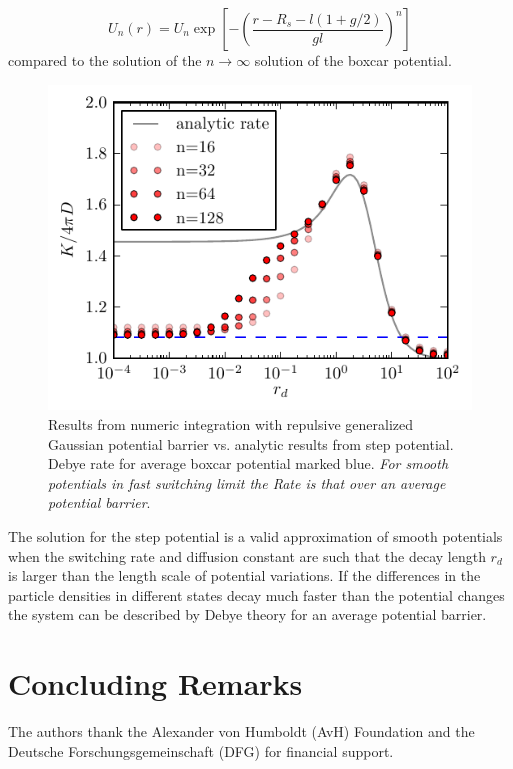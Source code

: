 \documentclass[twocolumn,superscriptaddress]{revtex4}
\begin{document}
\begin{equation}
    U_n(r) = U_n \exp \left[- \left(\frac{r-R_s-l(1+g/2)}{gl}\right)^{n} \right] 
    \label{generalized_gaussian}
\end{equation}
compared to the solution of the $n \rightarrow \infty$ solution of the boxcar potential.
\begin{figure}[H]
    \includegraphics[width= 0.5 \textwidth]{plots/rates_for_barrier_transition.pdf}
    \caption{Results from numeric integration with repulsive generalized Gaussian potential barrier vs. analytic results from step potential. Debye rate for average boxcar potential marked blue. \emph{For smooth potentials in fast switching limit the Rate is that over an average potential barrier}.}
\end{figure}
The solution for the step potential is a valid approximation of smooth potentials when the switching rate and diffusion constant are such that the decay length $r_d$ is larger than the length scale of potential variations. If the differences in the particle densities in different states decay much faster than the potential changes the system can be described by Debye theory for an average potential barrier. 

\section{Concluding Remarks}

\acknowledgments
The authors thank the Alexander von Humboldt (AvH) Foundation and the Deutsche Forschungsgemeinschaft (DFG) 
for financial support. 


\end{document}
